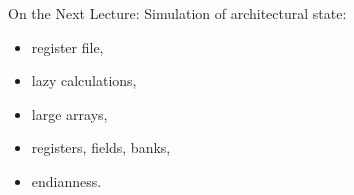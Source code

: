 \begin{frame}{On the Next Lecture:}
Simulation of architectural state:
\begin{itemize}
\item register file,
\item lazy calculations,
\item large arrays,
\item registers, fields, banks,
\item endianness.
\end{itemize}
\end{frame}

\finalslide


